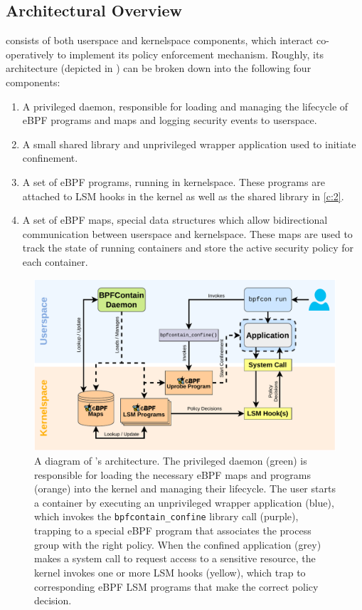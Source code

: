 \subsection{Architectural Overview}
\label{sub:architecture}

\bpfcontain{} consists of both userspace and kernelspace components, which interact co-operatively to implement its policy enforcement mechanism. Roughly, its architecture (depicted in ) can be broken down into the following four components:
\begin{enumerate}[label=\bfseries C\arabic*., ref=C\arabic*, labelindent=1em]
  \item \label{c:1}
    A privileged daemon, responsible for loading and managing the lifecycle of eBPF programs and maps and logging security events to userspace.

  \item \label{c:2}
    A small shared library and unprivileged wrapper application used to initiate confinement.

  \item \label{c:3}
  A set of eBPF programs, running in kernelspace. These programs are attached to LSM hooks in the kernel as well as the shared library in \ref{c:2}.

  \item \label{c:4}
  A set of eBPF maps, special data structures which allow bidirectional communication between userspace and kernelspace. These maps are used to track the state of running containers and store the active security policy for each container.
\end{enumerate}

\begin{figure}[htb]
  \centering
  \includegraphics[width=0.8\linewidth]{figs/architecture.pdf}
  \caption{
    A diagram of \bpfcontain{}'s architecture. The privileged daemon (green) is responsible for loading the necessary eBPF maps and programs (orange) into the kernel and managing their lifecycle. The user starts a container by executing an unprivileged wrapper application (blue), which invokes the \texttt{bpfcontain\_confine} library call (purple), trapping to a special eBPF program that associates the process group with the right policy.  When the confined application (grey) makes a system call to request access to a sensitive resource, the kernel invokes one or more LSM hooks (yellow), which trap to corresponding eBPF LSM programs that make the correct policy decision.
  }%
  \label{fig:architecture}
\end{figure}

